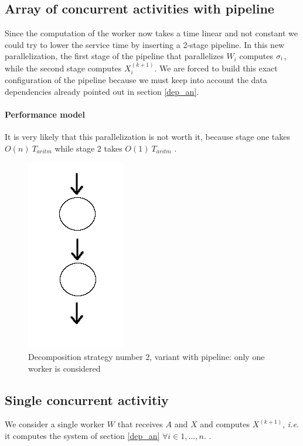 \documentclass{article}
\begin{document}
\subsection{Array of concurrent activities with pipeline}
Since the computation of the worker now takes a time linear and not constant we could try to lower the service time by inserting a 2-stage pipeline. In this new parallelization, the first stage of the pipeline that parallelizes $W_i$ computes $\sigma\textsubscript{i}$, while the second stage computes $X_{i}^{(k+1)}$. We are forced to build this exact configuration of the pipeline because we must keep into account the data dependencies already pointed out in section \ref{dep_an}.\\ 
\paragraph{Performance model} It is very likely that this parallelization is not worth it, because stage one takes $O(n) \: T_{aritm}$ while stage 2 takes $O(1) \: T_{aritm}$  . \\

\begin{figure}[h]
\centering
\includegraphics[scale=0.43]{single_worker_pipe}
\caption{Decomposition strategy number 2, variant with pipeline: only one worker is considered}
\label{fig:w_pipe}
\end{figure} 

\subsection{Single concurrent activitiy}
We consider a single worker $W$ that receives $A$ and $X$ and computes $X^{(k+1)}$, \textit{i.e.} it computes the system of section \ref{dep_an} $\forall i \in 1, ... , n $. .
\end{document}
